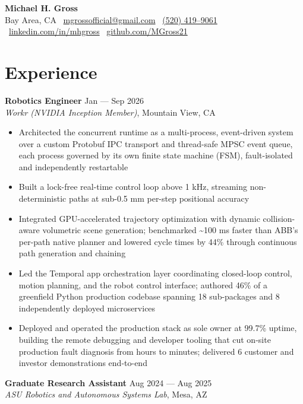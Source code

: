 \documentclass[10pt]{article}
\begin{document}

\begin{center}
    {\LARGE \textbf{Michael H. Gross}} \\
    Bay Area, CA \textbar\ \href{mailto:mgrossofficial@gmail.com}{mgrossofficial@gmail.com} \textbar\ \href{tel:+15204199061}{(520) 419--9061} \textbar\
    \href{https://www.linkedin.com/in/mhgross}{linkedin.com/in/mhgross} \textbar\ \href{https://github.com/MGross21}{github.com/MGross21}
\end{center}

\section*{Experience}
\textbf{Robotics Engineer} \hfill Jan --- Sep 2026 \\
\textit{Workr (NVIDIA Inception Member)}, Mountain View, CA
\begin{itemize}
\item Architected the concurrent runtime as a multi-process, event-driven system over a custom Protobuf IPC transport and thread-safe MPSC event queue, each process governed by its own finite state machine (FSM), fault-isolated and independently restartable
\item Built a lock-free real-time control loop above 1 kHz, streaming non-deterministic paths at sub-0.5 mm per-step positional accuracy
\item Integrated GPU-accelerated trajectory optimization with dynamic collision-aware volumetric scene generation; benchmarked \textasciitilde100 ms faster than ABB's per-path native planner and lowered cycle times by 44\% through continuous path generation and chaining
\item Led the Temporal app orchestration layer coordinating closed-loop control, motion planning, and the robot control interface; authored 46\% of a greenfield Python production codebase spanning 18 sub-packages and 8 independently deployed microservices
\item Deployed and operated the production stack as sole owner at 99.7\% uptime, building the remote debugging and developer tooling that cut on-site production fault diagnosis from hours to minutes; delivered 6 customer and investor demonstrations end-to-end
\end{itemize}
\vspace{0.5em}
\textbf{Graduate Research Assistant} \hfill Aug 2024 --- Aug 2025 \\
\textit{ASU Robotics and Autonomous Systems Lab}, Mesa, AZ
\end{document}
